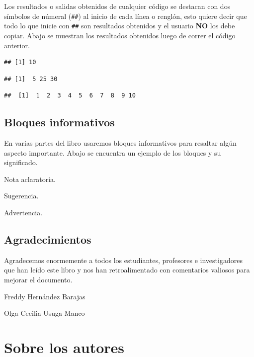 \documentclass[10pt,]{krantz}
\let\BeginKnitrBlock\begin \let\EndKnitrBlock\end
\begin{document}
Los resultados o salidas obtenidos de cualquier código se destacan con
dos símbolos de númeral (\texttt{\#\#}) al inicio de cada línea o
renglón, esto quiere decir que todo lo que inicie con \texttt{\#\#} son
resultados obtenidos y el usuario \textbf{NO} los debe copiar. Abajo se
muestran los resultados obtenidos luego de correr el código anterior.

\begin{verbatim}
## [1] 10
\end{verbatim}

\begin{verbatim}
## [1]  5 25 30
\end{verbatim}

\begin{verbatim}
##  [1]  1  2  3  4  5  6  7  8  9 10
\end{verbatim}

\section*{Bloques informativos}\label{bloques-informativos}


En varias partes del libro usaremos bloques informativos para resaltar
algún aspecto importante. Abajo se encuentra un ejemplo de los bloques y
su significado.

\BeginKnitrBlock{rmdnote}
Nota aclaratoria.
\EndKnitrBlock{rmdnote}

\BeginKnitrBlock{rmdtip}
Sugerencia.
\EndKnitrBlock{rmdtip}

\BeginKnitrBlock{rmdwarning}
Advertencia.
\EndKnitrBlock{rmdwarning}

\section*{Agradecimientos}\label{agradecimientos}


Agradecemos enormemente a todos los estudiantes, profesores e
investigadores que han leído este libro y nos han retroalimentado con
comentarios valiosos para mejorar el documento.

\BeginKnitrBlock{flushright}
Freddy Hernández Barajas

Olga Cecilia Usuga Manco
\EndKnitrBlock{flushright}

\chapter*{Sobre los autores}\label{sobre-los-autores}
\end{document}
